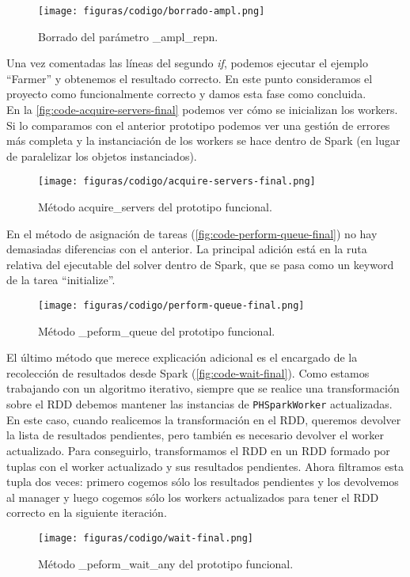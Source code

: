 \begin{figure}[H]
    \centerline{\texttt{[image: figuras/codigo/borrado-ampl.png]}}
    \caption{Borrado del parámetro \_ampl\_repn.}
    \label{fig:ampl-repn-deletion}
\end{figure}

Una vez comentadas las líneas del segundo \textit{if}, podemos ejecutar el ejemplo ``Farmer'' y obtenemos el resultado correcto. En este punto consideramos el proyecto como funcionalmente correcto y damos esta fase como concluida.\\

En la \autoref{fig:code-acquire-servers-final} podemos ver cómo se inicializan los workers. Si lo comparamos con el anterior prototipo podemos ver una gestión de errores más completa y la instanciación de los workers se hace dentro de Spark (en lugar de paralelizar los objetos instanciados).\\

\begin{figure}[H]
    \centerline{\texttt{[image: figuras/codigo/acquire-servers-final.png]}}
    \caption{Método acquire\_servers del prototipo funcional.}
    \label{fig:code-acquire-servers-final}
\end{figure}

En el método de asignación de tareas (\autoref{fig:code-perform-queue-final}) no hay demasiadas diferencias con el anterior. La principal adición está en la ruta relativa del ejecutable del solver dentro de Spark, que se pasa como un keyword de la tarea ``initialize''.\\

\begin{figure}[H]
    \centerline{\texttt{[image: figuras/codigo/perform-queue-final.png]}}
    \caption{Método \_peform\_queue del prototipo funcional.}
    \label{fig:code-perform-queue-final}
\end{figure}

El último método que merece explicación adicional es el encargado de la recolección de resultados desde Spark (\autoref{fig:code-wait-final}). Como estamos trabajando con un algoritmo iterativo, siempre que se realice una transformación sobre el RDD debemos mantener las instancias de \texttt{PHSparkWorker} actualizadas. En este caso, cuando realicemos la transformación en el RDD, queremos devolver la lista de resultados pendientes, pero también es necesario devolver el worker actualizado. Para conseguirlo, transformamos el RDD en un RDD formado por tuplas con el worker actualizado y sus resultados pendientes. Ahora filtramos esta tupla dos veces: primero cogemos sólo los resultados pendientes y los devolvemos al manager y luego cogemos sólo los workers actualizados para tener el RDD correcto en la siguiente iteración.

\begin{figure}[H]
    \centerline{\texttt{[image: figuras/codigo/wait-final.png]}}
    \caption{Método \_peform\_wait\_any del prototipo funcional.}
    \label{fig:code-wait-final}
\end{figure}